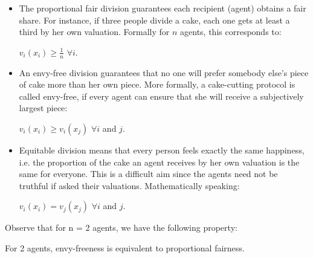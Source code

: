 \begin{itemize}
\item The proportional fair division guarantees each recipient (agent) obtains a fair share. 
For instance, if three people divide a cake, each one gets at least a third by her own valuation. 
Formally  for $n$ agents, this corresponds to:

 $v_i(x_i) \geq \frac{1}{n}$ $\forall i$.
\item An envy-free division guarantees that no one will prefer somebody else's piece of cake more than her own piece. 
More formally,  a cake-cutting protocol is called envy-free, if every agent can ensure that she will receive a subjectively largest piece:

 $v_i(x_i) \geq v_i(x_j)$ $\forall i$ and $j$.
\item Equitable division means that every person feels exactly the same happiness, 
i.e. the proportion of the cake an agent receives by her own valuation is the same for everyone. 
This is a difficult aim since the agents need not be truthful if asked their valuations.
Mathematically speaking:  

$v_i(x_i) = v_j(x_j)$ $\forall i$ and $j$.
 \end{itemize}

\bigskip

Observe that for n = 2 agents, we have the following property:

\begin{prop}
For 2 agents, envy-freeness is equivalent to proportional fairness.
\end{prop}

